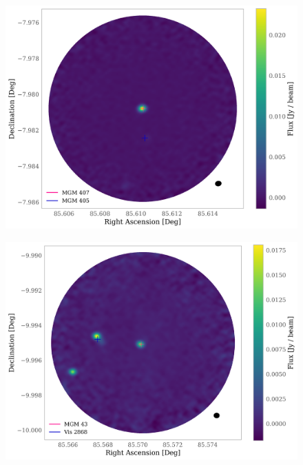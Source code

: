 \documentclass{aa}
\begin{document}
\begin{appendix}
\begin{figure}
\centering
   \includegraphics[width=\columnwidth]{MGM_407.png}
     \caption{}
\end{figure}

\begin{figure}
\centering
   \includegraphics[width=\columnwidth]{MGM_43.png}
    \caption{}
   \label{figure:MGM43}
\end{figure} 


\end{appendix}
\end{document}

